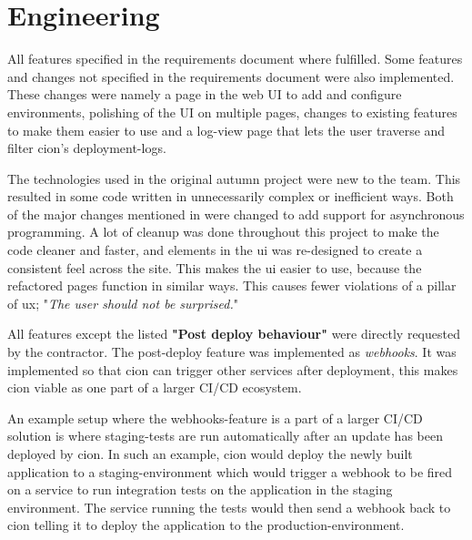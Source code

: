 \section{Engineering}

All features specified in the requirements document where fulfilled. Some features and changes not specified in the requirements document were also implemented. These changes were namely a page in the web UI to add and configure environments, polishing of the UI on multiple pages, changes to existing features to make them easier to use and a log-view page that lets the user traverse and filter cion's deployment-logs.

The technologies used in the original autumn project were new to the team. This resulted in some code written in unnecessarily complex or inefficient ways. Both of the major changes mentioned in  were changed to add support for asynchronous programming. A lot of cleanup was done throughout this project to make the code cleaner and faster, and elements in the \acrshort{ui} was re-designed to create a consistent feel across the site. This makes the \acrshort{ui} easier to use, because the refactored pages function in similar ways. This causes fewer violations of a pillar of \acrshort{ux}; "\textit{The user should not be surprised.}" 

All features except the listed \textbf{"Post deploy behaviour"} were directly requested by the contractor. The post-deploy feature was implemented as \textit{webhooks}. It was implemented so that cion can trigger other services after deployment, this makes cion viable as one part of a larger \acrshort{CI/CD} ecosystem. 

An example setup where the webhooks-feature is a part of a larger \acrshort{CI/CD} solution is where staging-tests are run automatically after an update has been deployed by cion. In such an example, cion would deploy the newly built application to a staging-environment which would trigger a webhook to be fired on a service to run integration tests on the application in the staging environment. The service running the tests would then send a webhook back to cion telling it to deploy the application to the production-environment.

